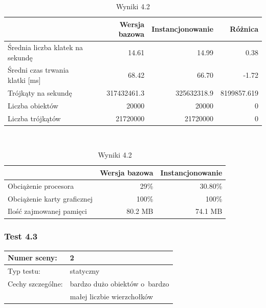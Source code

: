 \documentclass[a4paper,twoside,12pt]{book}
\begin{document}
\begin{table}[H]
    \centering
    \caption{Wyniki 4.2}
    \label{tab:instancing_test2}
    \begin{tabular}{|l||r|r|r|}
        \hline
        & Wersja bazowa & Instancjonowanie & Różnica \\
        \hline
        Średnia liczba klatek na sekundę & 14.61 & 14.99 & 0.38 \\
        \hline
        Średni czas trwania klatki [ms] & 68.42 & 66.70 & -1.72 \\
        \hline
        Trójkąty na sekundę & 317432461.3 & 325632318.9 & 8199857.619 \\
        \hline
        Liczba obiektów & 20000 & 20000 & 0 \\
        \hline
        Liczba trójkątów & 21720000 & 21720000 & 0 \\
        \hline
    \end{tabular} \\
    
    \vspace*{0.5 cm}
    
    \begin{tabular}{|l||r|r|}
         \hline
        & Wersja bazowa & Instancjonowanie \\
         \hline
        Obciążenie procesora & 29\% & 30.80\% \\
        \hline
        Obciążenie karty graficznej & 100\% & 100\% \\
        \hline
        Ilość zajmowanej pamięci & 80.2 MB & 74.1 MB \\
        \hline
    \end{tabular}
\end{table}

\subsubsection{Test 4.3}
\begin{tabular}{|l||l|}
\hline
Numer sceny: & 2 \\
\hline
Typ testu: & statyczny \\
\hline
Cechy szczególne: & bardzo dużo obiektów o~bardzo \\
& małej liczbie wierzchołków \\
\hline
\end{tabular}\\
\end{document}
